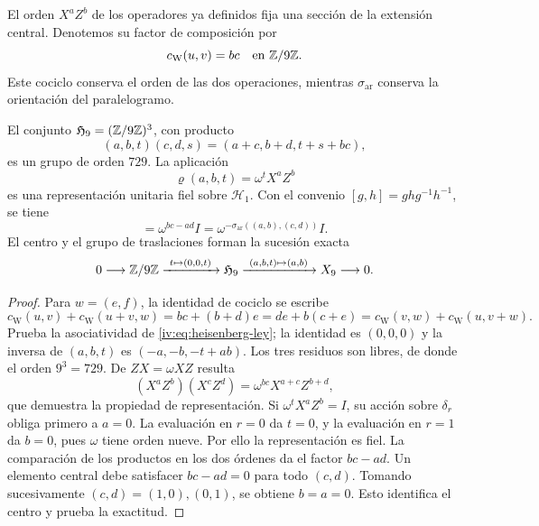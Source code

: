 El orden \(X^aZ^b\) de los operadores ya definidos fija una sección
de la extensión central. Denotemos su factor de composición por
\begin{equation}
 c_{\mathrm W}(u,v)=bc\quad\text{en }\mathbb Z/9\mathbb Z.
 \label{iv:eq:weyl-cociclo-polarizado}
\end{equation}
Este cociclo conserva el orden de las dos operaciones, mientras
\(\sigma_{\mathrm{ar}}\) conserva la orientación del paralelogramo.

\begin{proposition}
\label{iv:prop:heisenberg-orientado}
El conjunto \(\mathfrak H_9=(\mathbb Z/9\mathbb Z)^3\), con producto
\begin{equation}
 (a,b,t)(c,d,s)=(a+c,b+d,t+s+bc),
 \label{iv:eq:heisenberg-ley}
\end{equation}
es un grupo de orden \(729\). La aplicación
\[
 \varrho(a,b,t)=\omega^tX^aZ^b
\]
es una representación unitaria fiel sobre \(\mathcal H_1\).
Con el convenio \([g,h]=ghg^{-1}h^{-1}\), se tiene
\begin{equation}
 [\varrho(a,b,0),\varrho(c,d,0)]
 =\omega^{bc-ad}I
 =\omega^{-\sigma_{\mathrm{ar}}((a,b),(c,d))}I.
 \label{iv:eq:weyl-conmutador-orientado}
\end{equation}
El centro y el grupo de traslaciones forman la sucesión exacta
\[
 0\longrightarrow\mathbb Z/9\mathbb Z
 \xrightarrow{\ t\mapsto(0,0,t)\ }\mathfrak H_9
 \xrightarrow{\ (a,b,t)\mapsto(a,b)\ }X_9
 \longrightarrow0.
\]
\end{proposition}
\begin{proof}
Para \(w=(e,f)\), la identidad de cociclo se escribe
\[
 c_{\mathrm W}(u,v)+c_{\mathrm W}(u+v,w)
 =bc+(b+d)e
 =de+b(c+e)
 =c_{\mathrm W}(v,w)+c_{\mathrm W}(u,v+w).
\]
Prueba la asociatividad de \eqref{iv:eq:heisenberg-ley}; la identidad
es \((0,0,0)\) y la inversa de \((a,b,t)\) es
\((-a,-b,-t+ab)\). Los tres residuos son libres, de donde el orden
\(9^3=729\). De \(ZX=\omega XZ\) resulta
\[
 (X^aZ^b)(X^cZ^d)=\omega^{bc}X^{a+c}Z^{b+d},
\]
que demuestra la propiedad de representación. Si
\(\omega^tX^aZ^b=I\), su acción sobre \(\delta_r\) obliga primero
a \(a=0\). La evaluación en \(r=0\) da \(t=0\), y la
evaluación en \(r=1\) da \(b=0\), pues \(\omega\) tiene orden
nueve. Por ello la representación es fiel. La comparación de los
productos en los dos órdenes da el factor \(bc-ad\).
Un elemento central debe satisfacer \(bc-ad=0\) para todo \((c,d)\).
Tomando sucesivamente \((c,d)=(1,0),(0,1)\), se obtiene
\(b=a=0\). Esto identifica el centro y prueba la exactitud.
\end{proof}


